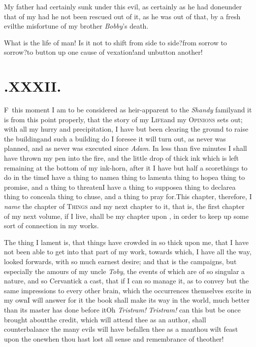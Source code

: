 \documentclass{article}
\begin{document}
My father had certainly sunk under this evil, as certainly as he
had done\pb under that of my \tsh\break had he not been rescued out of it, as he
was out of that, by a fresh evil\tsh\break the misfortune of my
brother \textit{Bobby}’s death.

What is the life of man! Is it not to shift from side to
side?\tsk from sorrow to sorrow?\tsh to button up
one cause of vexation!\tsk and unbutton another!

\bigskip
\section{.\enspace XXXII.}

\lettrine{F}{\,} this moment I am to be\break
considered as heir-apparent to the \textit{Shandy}
family\tsh and it is from this point properly, that the
story of my \textsc{Life}\break and my \textsc{Opinions} sets
out; with all my hurry and precipitation, I have but\pb 
been clearing the ground to raise the\break
building\tsh and such a building do I\break
foresee it will turn out, as never was planned, and as never was executed since
\textit{Adam}. In less than five minutes I shall have thrown
my pen into the fire, and the little drop of thick ink which
is left remaining at the bottom of my ink-horn, after it\tsh
I have but half a score\break things to do in the time\tsh I have
a thing to name\tsh a thing to lament\tsh a thing to
hope\tsh a thing to promise, and a thing to threaten\tsk I
have a thing to suppose\tsk a thing to declare\tsh a thing
to conceal\tsh a thing to chuse, and a thing to pray
for.\tsh This chapter, therefore, I \textit{name} the chapter
of \textsc{Things}\tsh\break 
and my next chapter to it, that is, the\break
first chapter of my next volume, if I live,\break
shall be my chapter upon ,\pb
in order to keep up some sort of connection in my works.

The thing I lament is, that things have crowded in so thick upon
me, that I have not been able to get into that part of my work,
towards which, I have all the way, looked forwards, with so much
earnest desire; and that is the campaigns, but especially the
amours of my uncle \textit{Toby}, the events of which are of so
singular a nature, and so Cervantick a cast, that if I can so
manage it, as to convey but the same impressions to every other
brain, which the occurrences themselves excite in my own\tsh I
will answer for it the book shall make its way in the world, much
better than its master has done before it\tsh Oh
\textit{Tristram!} \textit{Tristram!} can this but be once brought
about\tsh the credit,\pb
which will attend thee as an author, shall counterbalance the many
evils will have befallen thee as a man\tsh thou wilt feast
upon the one\tsh when thou hast lost all sense and
remembrance of the\break other!\tsh
\end{document}
